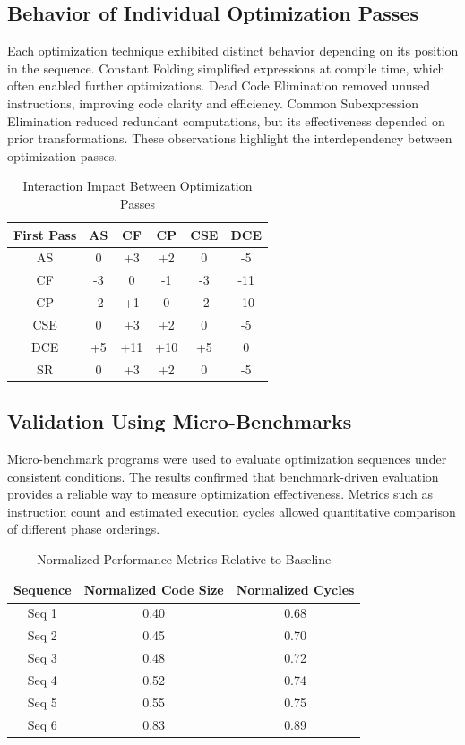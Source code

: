 \documentclass[conference]{IEEEtran}
\begin{document}
\subsection{Behavior of Individual Optimization Passes}
Each optimization technique exhibited distinct behavior depending on its position in the sequence. Constant Folding simplified expressions at compile time, which often enabled further optimizations. Dead Code Elimination removed unused instructions, improving code clarity and efficiency. Common Subexpression Elimination reduced redundant computations, but its effectiveness depended on prior transformations. These observations highlight the interdependency between optimization passes.

\begin{table}[!htbp]
\centering
\caption{Interaction Impact Between Optimization Passes}
\label{tab:pass_interaction}
\begin{tabular}{|c|c|c|c|c|c|}
\hline
\textbf{First Pass} & \textbf{AS} & \textbf{CF} & \textbf{CP} & \textbf{CSE} & \textbf{DCE} \\
\hline
AS  & 0  & +3 & +2 & 0  & -5 \\
CF  & -3 & 0  & -1 & -3 & -11 \\
CP  & -2 & +1 & 0  & -2 & -10 \\
CSE & 0  & +3 & +2 & 0  & -5 \\
DCE & +5 & +11 & +10 & +5 & 0 \\
SR  & 0  & +3 & +2 & 0  & -5 \\
\hline
\end{tabular}
\end{table}

\subsection{Validation Using Micro-Benchmarks}
Micro-benchmark programs were used to evaluate optimization sequences under consistent conditions. The results confirmed that benchmark-driven evaluation provides a reliable way to measure optimization effectiveness. Metrics such as instruction count and estimated execution cycles allowed quantitative comparison of different phase orderings.

\begin{table}[!htbp]
\centering
\caption{Normalized Performance Metrics Relative to Baseline}
\label{tab:normalized_performance}
\begin{tabular}{|c|c|c|}
\hline
\textbf{Sequence} & \textbf{Normalized Code Size} & \textbf{Normalized Cycles} \\
\hline
Seq 1 & 0.40 & 0.68 \\
Seq 2 & 0.45 & 0.70 \\
Seq 3 & 0.48 & 0.72 \\
Seq 4 & 0.52 & 0.74 \\
Seq 5 & 0.55 & 0.75 \\
Seq 6 & 0.83 & 0.89 \\
\hline
\end{tabular}
\end{table}
\end{document}
